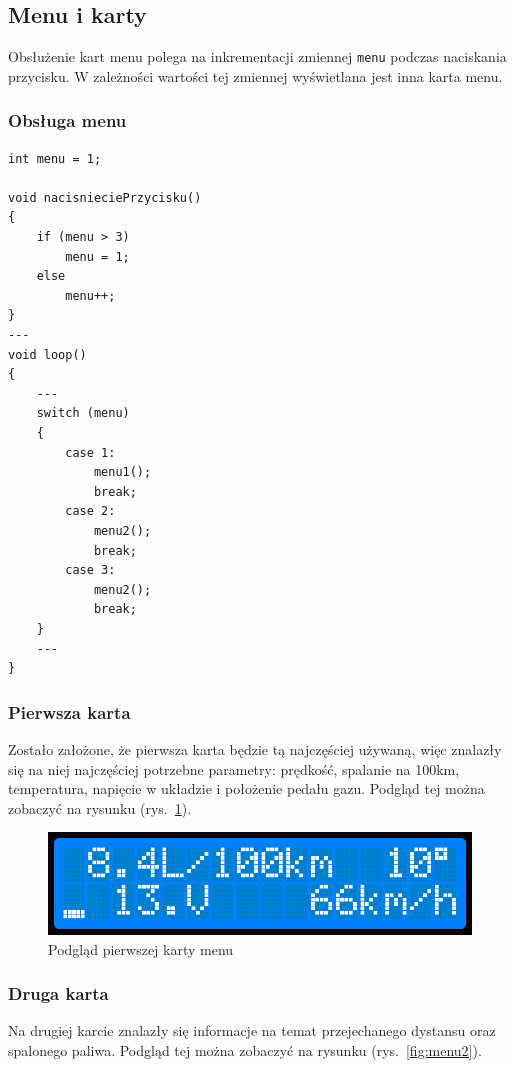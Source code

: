 \subsection{Menu i karty}
Obsłużenie kart menu polega na inkrementacji zmiennej \texttt{menu} podczas naciskania przycisku. W zależności wartości tej zmiennej wyświetlana jest inna karta menu.

\subsubsection{Obsługa menu}

\begin{lstlisting}[label=list:menu,caption=Implementacja obsługi menu,
basicstyle=\footnotesize\ttfamily]
int menu = 1;

void nacisnieciePrzycisku()
{
    if (menu > 3)
        menu = 1;
    else
        menu++;
}
---
void loop()
{
    ---
    switch (menu) 
    {
        case 1:
            menu1();
            break;
        case 2:
            menu2();
            break;
        case 3:
            menu2();
            break;
    }
    ---
}
\end{lstlisting}

\subsubsection{Pierwsza karta}

Zostało założone, że pierwsza karta będzie tą najczęściej używaną, więc znalazły się na niej najczęściej potrzebne parametry: prędkość, spalanie na 100km, temperatura, napięcie w układzie i położenie pedału gazu. Podgląd tej można zobaczyć na rysunku (rys.~\ref{fig:menu1}).

\begin{figure}[h]
\centering
\includegraphics[width=0.7\linewidth]{Rysunki/menu1.png}
\caption{Podgląd pierwszej karty menu}
\label{fig:menu1}
\end{figure}

\subsubsection{Druga karta}
Na drugiej karcie znalazły się informacje na temat przejechanego dystansu oraz spalonego paliwa. Podgląd tej można zobaczyć na rysunku (rys.~\ref{fig:menu2}).


